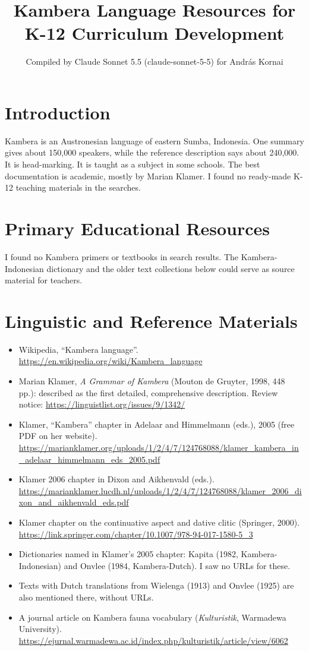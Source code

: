\documentclass[12pt]{article}
\title{Kambera Language Resources for K-12 Curriculum Development}
\author{Compiled by Claude Sonnet 5.5 (claude-sonnet-5-5) for Andr\'as Kornai}
\date{}
\begin{document}
\maketitle

\section{Introduction}
Kambera is an Austronesian language of eastern Sumba, Indonesia. One summary gives about 150,000 speakers, while the reference description says about 240,000. It is head-marking. It is taught as a subject in some schools. The best documentation is academic, mostly by Marian Klamer. I found no ready-made K-12 teaching materials in the searches.

\section{Primary Educational Resources}
I found no Kambera primers or textbooks in search results. The Kambera-Indonesian dictionary and the older text collections below could serve as source material for teachers.

\section{Linguistic and Reference Materials}
\begin{itemize}
\item Wikipedia, ``Kambera language''. \url{https://en.wikipedia.org/wiki/Kambera_language}
\item Marian Klamer, \emph{A Grammar of Kambera} (Mouton de Gruyter, 1998, 448 pp.): described as the first detailed, comprehensive description. Review notice: \url{https://linguistlist.org/issues/9/1342/}
\item Klamer, ``Kambera'' chapter in Adelaar and Himmelmann (eds.), 2005 (free PDF on her website). \url{https://marianklamer.org/uploads/1/2/4/7/124768088/klamer_kambera_in_adelaar_himmelmann_eds_2005.pdf}
\item Klamer 2006 chapter in Dixon and Aikhenvald (eds.). \url{https://marianklamer.lucdh.nl/uploads/1/2/4/7/124768088/klamer_2006_dixon_and_aikhenvald_eds.pdf}
\item Klamer chapter on the continuative aspect and dative clitic (Springer, 2000). \url{https://link.springer.com/chapter/10.1007/978-94-017-1580-5_3}
\item Dictionaries named in Klamer's 2005 chapter: Kapita (1982, Kambera-Indonesian) and Onvlee (1984, Kambera-Dutch). I saw no URLs for these.
\item Texts with Dutch translations from Wielenga (1913) and Onvlee (1925) are also mentioned there, without URLs.
\item A journal article on Kambera fauna vocabulary (\emph{Kulturistik}, Warmadewa University). \url{https://ejurnal.warmadewa.ac.id/index.php/kulturistik/article/view/6062}
\end{itemize}
\end{document}
